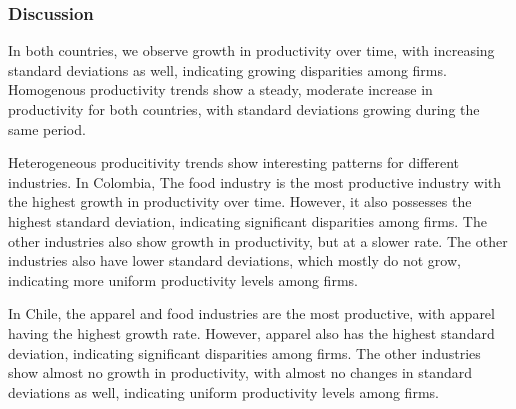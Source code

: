 \documentclass{article}
\begin{document}
\subsubsection*{Discussion}

In both countries, we observe growth in productivity over time, with increasing standard deviations as well,
indicating growing disparities among firms. Homogenous productivity trends show a steady, moderate increase in 
productivity for both countries, with standard deviations growing during the same period. 

Heterogeneous producitivity trends show interesting patterns for different industries. In Colombia,
The food industry is the most productive industry with the highest growth in productivity over time. However, it
also possesses the highest standard deviation, indicating significant disparities among firms. The other industries also show
growth in productivity, but at a slower rate. The other industries also have lower standard deviations, which mostly do not grow,
indicating more uniform productivity levels among firms.

In Chile, the apparel and food industries are the most productive, with apparel having the highest growth rate. However, apparel also has
the highest standard deviation, indicating significant disparities among firms. The other industries show almost no growth in productivity,
with almost no changes in standard deviations as well, indicating uniform productivity levels among firms.
\end{document}
